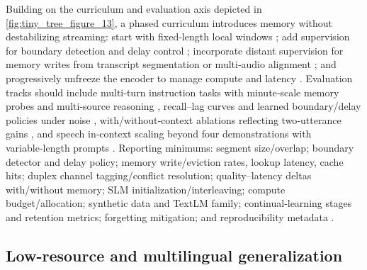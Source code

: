 \documentclass{article}
\begin{document}
Building on the curriculum and evaluation axis depicted in \autoref{fig:tiny_tree_figure_13}, a phased curriculum introduces memory without destabilizing streaming: start with fixed‑length local windows \cite{hsu2024exploringcontextlearningtextlessspeechla}; add supervision for boundary detection and delay control \cite{guo2025streamuniachievingstreamingspeechtransla}; incorporate distant supervision for memory writes from transcript segmentation or multi‑audio alignment \cite{huang2025dynamicsuperbphase2collaborativelyexpand}; and progressively unfreeze the encoder to manage compute and latency \cite{nguyen2025qwenvsgemmaintegrationwhispercomparative}. Evaluation tracks should include multi‑turn instruction tasks with minute‑scale memory probes and multi‑source reasoning \cite{huang2025dynamicsuperbphase2collaborativelyexpand}, recall–lag curves and learned boundary/delay policies under noise \cite{guo2025streamuniachievingstreamingspeechtransla}, with/without‑context ablations reflecting two‑utterance gains \cite{li2025seewossubmissionmlcslmlessonslearnedspee}, and speech in‑context scaling beyond four demonstrations with variable‑length prompts \cite{hsu2024exploringcontextlearningtextlessspeechla}. Reporting minimums: segment size/overlap; boundary detector and delay policy; memory write/eviction rates, lookup latency, cache hits; duplex channel tagging/conflict resolution; quality–latency deltas with/without memory; SLM initialization/interleaving; compute budget/allocation; synthetic data and TextLM family; continual‑learning stages and retention metrics; forgetting mitigation; and reproducibility metadata \cite{maimon2025scalinganalysisinterleavedspeechtextlang,hsiao2025analyzingmitigationstrategiescatastrophi,chen2023reducingbarriersselfsupervisedlearninghu}.

\subsection{Low-resource and multilingual generalization} \label{subsec:Low-resource and multilingual generalization}
\end{document}

